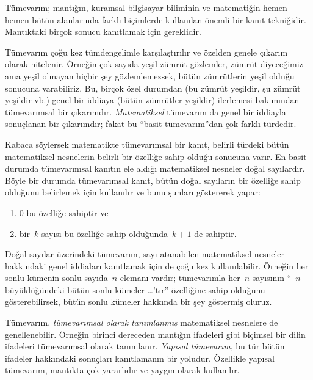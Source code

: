 



Tümevarım; mantığın, kuramsal bilgisayar biliminin ve matematiğin hemen
hemen bütün alanlarında farklı biçimlerde kullanılan önemli bir kanıt
tekniğidir. Mantıktaki birçok sonucu kanıtlamak için gereklidir.

Tümevarım çoğu kez tümdengelimle karşılaştırılır ve özelden genele
çıkarım olarak nitelenir. Örneğin çok sayıda yeşil zümrüt gözlemler,
zümrüt diyeceğimiz ama yeşil olmayan hiçbir şey gözlemlemezsek, bütün
zümrütlerin yeşil olduğu sonucuna varabiliriz. Bu, birçok özel durumdan
(bu zümrüt yeşildir, şu zümrüt yeşildir vb.) genel bir iddiaya (bütün
zümrütler yeşildir) ilerlemesi bakımından tümevarımsal bir çıkarımdır.
\emph{Matematiksel} tümevarım da genel bir iddiayla sonuçlanan bir
çıkarımdır; fakat bu ``basit tümevarım''dan çok farklı türdedir.

Kabaca söylersek matematikte tümevarımsal bir kanıt, belirli türdeki
bütün matematiksel nesnelerin belirli bir özelliğe sahip olduğu sonucuna
varır. En basit durumda tümevarımsal kanıtın ele aldığı matematiksel
nesneler doğal sayılardır. Böyle bir durumda tümevarımsal kanıt, bütün
doğal sayıların bir özelliğe sahip olduğunu belirlemek için kullanılır
ve bunu şunları göstererek yapar:
\begin{enumerate}
    \item $0$ bu özelliğe sahiptir ve
    \item bir~$k$ sayısı bu özelliğe sahip olduğunda~$k+1$ de sahiptir.
\end{enumerate}
Doğal sayılar üzerindeki tümevarım, sayı atanabilen matematiksel
nesneler hakkındaki genel iddiaları kanıtlamak için de çoğu kez
kullanılabilir. Örneğin her sonlu kümenin sonlu sayıda~$n$ elemanı
vardır; tümevarımla her~$n$ sayısının ``~$n$ büyüklüğündeki bütün sonlu
kümeler \dots'tır'' özelliğine sahip olduğunu gösterebilirsek, bütün
sonlu kümeler hakkında bir şey göstermiş oluruz.

Tümevarım, \emph{tümevarımsal olarak tanımlanmış} matematiksel nesnelere
de genellenebilir. Örneğin birinci dereceden mantığın ifadeleri gibi
biçimsel bir dilin ifadeleri tümevarımsal olarak tanımlanır.
\emph{Yapısal tümevarım}, bu tür bütün ifadeler hakkındaki sonuçları
kanıtlamanın bir yoludur. Özellikle yapısal tümevarım, mantıkta çok
yararlıdır ve yaygın olarak kullanılır.


